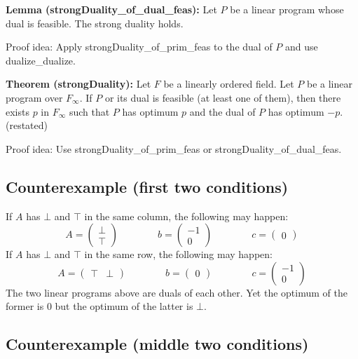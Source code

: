 \documentclass[]{article}
\renewcommand{\.}{\hskip .75pt}
\begin{document}
\medskip \noindent
\textbf{Lemma (strongDuality\_of\_dual\_feas):}
Let $P$ be a linear program whose dual is feasible.
The strong duality holds.

\medskip \noindent
Proof idea:
Apply strongDuality\_of\_prim\_feas to the dual of $P$ and
use dualize\_dualize.

\medskip \noindent
\textbf{Theorem (strongDuality):}
Let $F$ be a linearly ordered field.
Let $P$ be a linear program over $F_\infty$.
If $P$ or its dual is feasible (at least one of them),
then there exists $p$ in $F_\infty$ such that
$P$ has optimum $p$ and the dual of $P$ has optimum $-p$.
(restated)

\medskip \noindent
Proof idea:
Use strongDuality\_of\_prim\_feas or strongDuality\_of\_dual\_feas.

\subsection{Counterexample (first two conditions)}

If $A$ has $\bot$ and $\top$ in the same column, the following may happen:
$$
A = \begin{pmatrix} \bot \\ \top \end{pmatrix}
\qquad \qquad
b = \begin{pmatrix} -1 \\ 0 \end{pmatrix}
\qquad \qquad
c = \begin{pmatrix} 0 \end{pmatrix}
$$
If $A$ has $\bot$ and $\top$ in the same row, the following may happen:
$$
A = \begin{pmatrix} \top & \bot \end{pmatrix}
\qquad \qquad
b = \begin{pmatrix} 0 \end{pmatrix}
\qquad \qquad
c = \begin{pmatrix} -1 \\ 0 \end{pmatrix}
$$
The two linear programs above are duals of each other.
Yet the optimum of the former is $0$
but the optimum of the latter is $\bot$.

\subsection{Counterexample (middle two conditions)}
\end{document}
